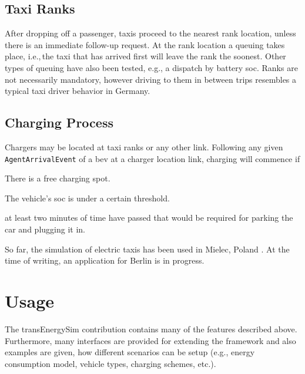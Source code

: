 \subsection{Taxi Ranks}
After dropping off a passenger, taxis proceed to the nearest rank location, unless there is an immediate follow-up request. At the rank location a queuing takes place, i.e.,\,the taxi that has arrived first will leave the rank the soonest. Other types of queuing have also been tested, e.g., a dispatch by battery \gls{soc}.
Ranks are not necessarily mandatory, however driving to them in between trips resembles a typical taxi driver behavior in Germany.

\subsection{Charging Process}
Chargers may be located at taxi ranks or any other link. Following any given \lstinline$AgentArrivalEvent$ of a \gls{bev} at a charger location link, charging will commence if
%
\begin{compactitem}
	\item There is a free charging spot.
	\item The vehicle's \gls{soc} is under a certain threshold.
	\item at least two minutes of time have passed that would be required for parking the car and plugging it in.
\end{compactitem}

So far, the simulation of electric taxis has been used in Mielec, Poland \citep[][]{Bischoff2013MaTaxis, BischoffMaciejewskiEcabMielecMobilTUM}. At the time of writing, an application for Berlin is in progress.

\section{Usage}
The transEnergySim \gls{contribution} contains many of the features described above. Furthermore, many interfaces are provided for extending the framework and also examples are given, how different scenarios can be setup (e.g., energy consumption model, vehicle types, charging schemes, etc.).


